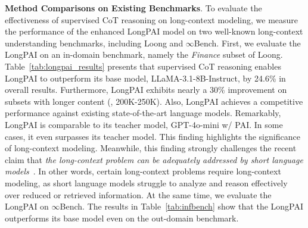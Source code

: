 \noindent \textbf{Method Comparisons on Existing Benchmarks}.
To evaluate the effectiveness of supervised CoT reasoning 
on long-context modeling, we measure the performance of the enhanced LongPAI model on two well-known long-context understanding benchmarks, including Loong and $\infty$Bench. 
First, we evaluate the LongPAI on an in-domain benchmark, namely the \textit{Finance} subset of Loong.
Table~\ref{tab:longpai_results} presents that supervised CoT reasoning enables LongPAI to outperform its base model, LLaMA-3.1-8B-Instruct, by 24.6\% in overall results. Furthermore, LongPAI exhibits nearly a 30\% improvement on subsets with longer content (\ie, 200K-250K). Also, LongPAI achieves a competitive performance against existing state-of-the-art language models. Remarkably, LongPAI is comparable to its teacher model, GPT-4o-mini w/ PAI. In some cases, it even surpasses its teacher model. This finding highlights the significance of long-context modeling. Meanwhile, this finding strongly challenges the recent claim that \textit{the long-context problem can be adequately addressed by short language models}~\cite{qian2024long,chen2024long}. In other words, certain long-context problems require long-context modeling, as short language models struggle to analyze and reason effectively over reduced or retrieved information. At the same time, we evaluate the LongPAI on $\infty$Bench. The results in Table~\ref{tab:infbench} show that the LongPAI outperforms its base model even on the out-domain benchmark.






